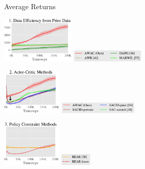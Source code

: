 \begin{figure}[t]
    \centering
    \begin{subfigure}[b]{0.01\textwidth}
        \center
        \begin{turn}{90} 
            \scriptsize
            Average Returns
        \end{turn}
        \vspace{0.5cm}
    \end{subfigure}
    \begin{subfigure}[b]{0.27\textwidth}
        \center
        \includegraphics[height=2.2cm]{awac/figures/challenges/hc_pg-crop.pdf}
        \includegraphics[height=0.55cm]{awac/figures/challenges/hc_pg_legend-crop.pdf}
    \end{subfigure}
    \begin{subfigure}[b]{0.25\textwidth}
        \center
        \includegraphics[height=2.2cm]{awac/figures/challenges/hc_sac-crop.pdf}
        \includegraphics[height=0.55cm]{awac/figures/challenges/hc_sac_legend-crop.pdf}
    \end{subfigure}
    \begin{subfigure}[b]{0.22\textwidth}
        \center
        \includegraphics[height=2.2cm]{awac/figures/challenges/hc_constrain-crop.pdf}
        \includegraphics[height=0.55cm]{awac/figures/challenges/hc_constrain_legend-crop.pdf}

\end{subfigure}
\end{figure}
